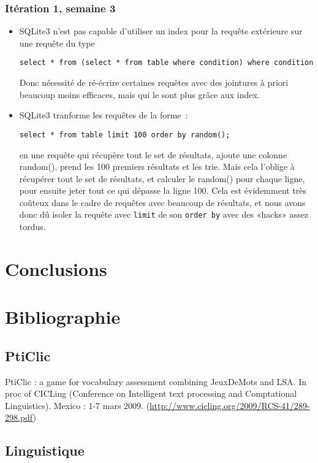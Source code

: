 \documentclass[a4paper,11pt,french]{article}
\begin{document}
\subsubsection{Itération 1, semaine 3}
\begin{itemize}
\item SQLite3 n'est pas capable d'utiliser un index pour la requête extérieure sur une requête du type
\begin{verbatim}
select * from (select * from table where condition) where condition
\end{verbatim}
Donc nécessité de ré-écrire certaines requêtes avec des jointures à priori beaucoup moins efficaces, mais qui le sont plus grâce aux index.
\item SQLite3 tranforme les requêtes de la forme~:
\begin{verbatim}
select * from table limit 100 order by random();
\end{verbatim}
  en une requête qui récupère tout le set de résultats, ajoute une colonne random(), prend les 100 premiers résultats et les trie. Mais cela
  l'oblige à récupérer tout le set de résultats, et calculer le random() pour chaque ligne, pour ensuite jeter tout ce qui dépasse la ligne
  100. Cela est évidemment très coûteux dans le cadre de requêtes avec beaucoup de résultats, et nous avons donc dû isoler la requête avec
  \verb!limit! de son \verb!order by! avec des «hacks» assez tordus.
\end{itemize}

\section{Conclusions}

\newpage


\section{Bibliographie}
\subsection{PtiClic}

PtiClic : a game for vocabulary assessment combining JeuxDeMots and LSA. In proc of CICLing (Conference on Intelligent text processing and Comptational Linguistics). Mexico : 1-7 mars 2009. (\url{http://www.cicling.org/2009/RCS-41/289-298.pdf})


\subsection{Linguistique}
\end{document}
